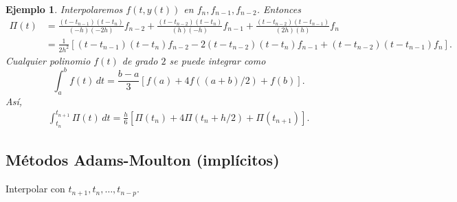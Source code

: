 \documentclass[11pt,letterpaper]{report}
\newtheorem{example}{Ejemplo}
\begin{document}
\begin{example}
  Interpolaremos $f(t,y(t))$ en $f_n,f_{n-1},f_{n-2}$. Entonces
  \begin{align}
    \Pi(t)
    &= \frac{(t-t_{n-1})(t-t_n)}{(-h)(-2h)}f_{n-2}
    +  \frac{(t-t_{n-2})(t-t_n)}{(h)(-h)}f_{n-1}
    +  \frac{(t-t_{n-2})(t-t_{n-1})}{(2h)(h)}f_{n}
    \\
    &=
    \frac{1}{2h^{2}}
    \left[
      (t-t_{n-1})(t-t_n)f_{n-2}
    - 2(t-t_{n-2})(t-t_n)f_{n-1}
    + (t-t_{n-2})(t-t_{n-1})f_{n}
    \right]
  .\end{align}
  Cualquier polinomio $f(t)$ de grado $2$ se puede integrar como
  \begin{equation}
    \int_{a}^{b}f(t)\,dt = \frac{b-a}{3}[f(a)+4f((a+b)/2)+f(b)]
  .\end{equation}
  Así,
  \begin{align}
     \int_{t_n}^{t_{n+1}}\Pi(t)\,dt
     =
     \frac{h}{6}[\Pi(t_{n})+4\Pi(t_{n}+h / 2)+\Pi(t_{n+1})]
  .\end{align}
\end{example}

\subsection{Métodos Adams-Moulton (implícitos)}
Interpolar con $t_{n+1},t_n,\dots,t_{n-p}$.
\end{document}
